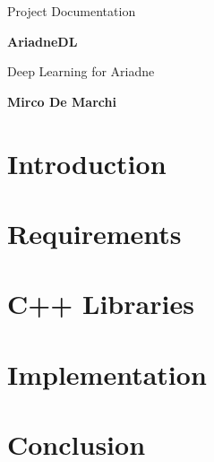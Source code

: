 \documentclass[12pt, a4paper,titlepage]{report}
\begin{document}
	\begin{titlepage}
		\begin{center}
			\vspace*{2cm}
			
			\normalsize
			Project Documentation
			
			\vspace{2.5cm}
			
			\Huge
			\textbf{AriadneDL}
			\vspace{0.5cm}
			
			\large
			Deep Learning for Ariadne
			
			\vspace{3cm}
			
			\large
			\textbf{Mirco De Marchi}
			
			\vspace{5cm}
		\end{center}
	\end{titlepage}
	
	\tableofcontents
	
	\chapter{Introduction}
	
	
	\chapter{Requirements}
	
	
	\chapter{C++ Libraries}
	
	
	\chapter{Implementation}
	
	
	\chapter{Conclusion}
	
	
\end{document}
